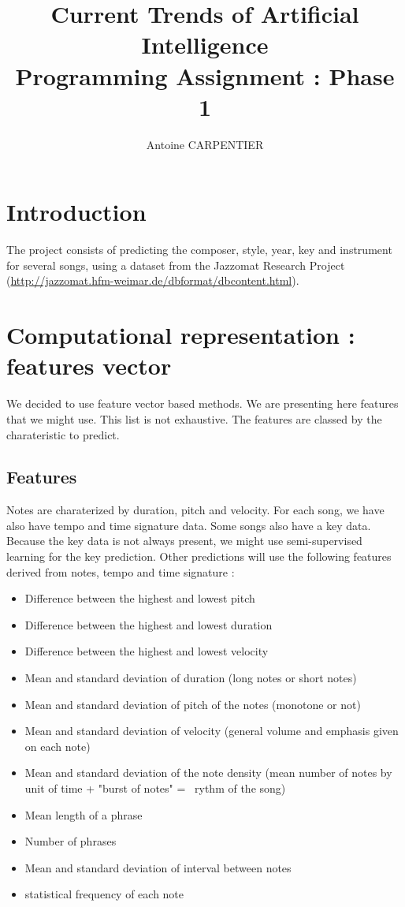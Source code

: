 \documentclass[a4paper,12pt]{article}
\author{Antoine CARPENTIER}
\title{Current Trends of Artificial Intelligence\\ \small Programming Assignment : Phase 1}
\begin{document}
\maketitle

\section{Introduction}

The project consists of predicting the composer, style, year, key and instrument for several songs, using a dataset from the Jazzomat Research Project (\url{http://jazzomat.hfm-weimar.de/dbformat/dbcontent.html}).

\section{Computational representation : features vector}

We decided to use feature vector based methods. We are presenting here features that we might use. This list is not exhaustive. The features are classed by the charateristic to predict.

\subsection{Features}
    Notes are charaterized by duration, pitch and velocity. For each song, we have also have tempo and time signature data. Some songs also have a key data. Because the key data is not always present, we might use semi-supervised learning for the key prediction.
    Other predictions will use the following features derived from notes, tempo and time signature : 

    \begin{itemize}
        \item Difference between the highest and lowest pitch
        \item Difference between the highest and lowest duration
        \item Difference between the highest and lowest velocity
        \item Mean and standard deviation of duration (long notes or short notes)
        \item Mean and standard deviation of pitch of the notes (monotone or not)
        \item Mean and standard deviation of velocity (general volume and emphasis given on each note)
        \item Mean and standard deviation of the note density (mean number of notes by unit of time + "burst of notes" =~ rythm of the song) 
        \item Mean length of a phrase
        \item Number of phrases
        \item Mean and standard deviation of interval between notes
        \item statistical frequency of each note 
    \end{itemize}
\end{document}
